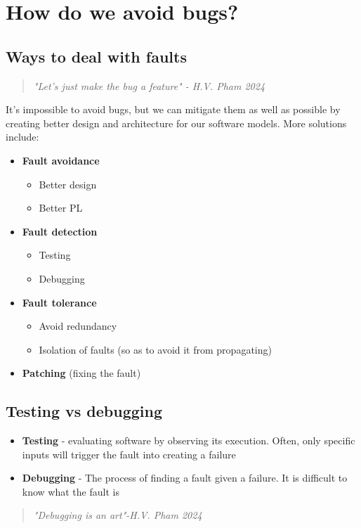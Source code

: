 \documentclass[12pt]{book}
\begin{document}
\section*{How do we avoid bugs?}

\subsection*{Ways to deal with faults}

\begin{quote}
  \textit{"Let's just make the bug a feature" - H.V. Pham 2024}
\end{quote}

It's impossible to avoid bugs, but we can mitigate them as well as possible by creating better design and architecture for our software models. More solutions include:

\begin{itemize}
  \item \textbf{Fault avoidance}
  \begin{itemize}
    \item Better design
    \item Better PL
  \end{itemize} 

  \item \textbf{Fault detection}
    \begin{itemize}
      \item Testing
    \item Debugging
  \end{itemize}
  
  \item \textbf{Fault tolerance}
    \begin{itemize}
      \item Avoid redundancy
      \item Isolation of faults (so as to avoid it from propagating)
    \end{itemize}

    \item \textbf{Patching} (fixing the fault)
\end{itemize}

\subsection*{Testing vs debugging}

\begin{itemize}
  \item \textbf{Testing} - evaluating software by observing its execution. Often, only specific inputs will trigger the fault into creating a failure
  \item \textbf{Debugging} - The process of finding a fault given a failure. It is difficult to know what the fault is
\end{itemize}

\begin{quote}
  \textit{"Debugging is an art"-H.V. Pham 2024}
\end{quote}
\end{document}

